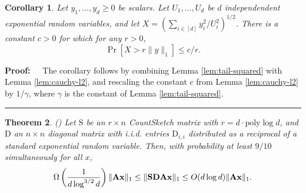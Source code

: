 \documentclass[11pt]{article}
\newtheorem{theorem}{Theorem}
\newtheorem{corollary}[theorem]{Corollary}
\newenvironment{proof}{\begin{trivlist} \item {\bf Proof:~~}}
  {\qed\end{trivlist}}
\newcommand{\mat}[1]{{\ensuremath{\bm{\mathrm{#1}}}}}
\def\matA{\mat{A}}
\def\matD{\mat{D}}
\def\matS{\mat{S}}
\def\frac#1#2{{#1\over #2}}
\def\qed{\hfill\rule{2mm}{2mm}}
\def\x{{\mathbf x}}
\newcommand{\poly}{{\mathrm{poly}}}
\begin{document}
\begin{corollary}\label{cor:upper}
Let $y_1, \ldots, y_d \geq 0$ be scalars. 
Let $U_1, \ldots, U_d$ be $d$ independendent exponential random variables, 
and let $X = (\sum_{i \in [d]} y_i^2/U_i^2)^{1/2}$. There is a constant $c > 0$ for which for any $r > 0$,
$$\Pr[X > r \|y\|_1] \leq c/r.$$
\end{corollary}
\begin{proof}
The corollary follows by combining Lemma \ref{lem:tail-squared} with Lemma \ref{lem:cauchy-l2}, and rescaling the constant $c$ from Lemma \ref{lem:cauchy-l2}
by $1/\gamma$, where $\gamma$ is the constant of Lemma \ref{lem:tail-squared}. 
\end{proof}


\begin{theorem}\label{thm:expWork}(\cite{wz13})
Let $\matS$ be an $r \times n$ CountSketch matrix with $r = d \cdot \poly\log d$, and $\matD$ an $n \times n$ diagonal matrix
with i.i.d. entries $\matD_{i,i}$ distributed as a reciprocal of a standard exponential random variable. 
Then, with probability at least $9/10$ simultaneously for all $x$,
$$\Omega\left (\frac{1}{d \log^{3/2} d} \right )\|\matA \x\|_1 \leq \|\matS \matD \matA \x\|_1 \leq O(d \log d) \|\matA \x\|_1.$$
\end{theorem}
\end{document}
